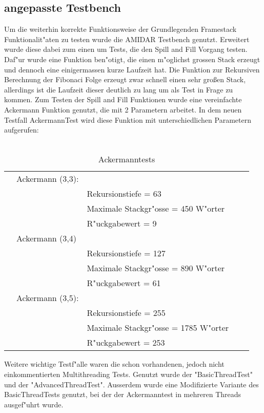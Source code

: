 \subsection{angepasste Testbench}
Um die weiterhin korrekte Funktionsweise der Grundlegenden Framestack Funktionalit"aten zu testen wurde die AMIDAR Testbench genutzt. Erweitert wurde diese dabei zum einen um Tests, die den Spill and Fill Vorgang testen. Daf"ur wurde eine Funktion ben"otigt, die einen m"oglichst gro{ss}en Stack erzeugt und dennoch eine einigerma{ss}en kurze Laufzeit hat. Die Funktion zur Rekursiven Berechnung der Fibonaci Folge erzeugt zwar schnell einen sehr großen Stack, allerdings ist die Laufzeit dieser deutlich zu lang um als Test in Frage zu kommen. Zum  Testen der Spill and Fill Funktionen wurde eine vereinfachte Ackermann Funktion genutzt, die mit 2 Parametern arbeitet.
In dem neuen Testfall AckermannTest wird diese Funktion mit unterschiedlichen Parametern aufgerufen: \\\\

\begin{table}[]
\centering
\caption{Ackermanntests}
\label{my-label}
\begin{tabular}{lllll}
 & Ackermann (3,3):  & \\
 &  & Rekursionstiefe 		= 63 \\
 &  & Maximale Stackgr"o{ss}e = 450 W"orter  \\
 &  & 	R"uckgabewert 			= 9 \\
 & Ackermann (3,4)  &\\
 &  & Rekursionstiefe			= 127 \\
 &	& Maximale Stackgr"o{ss}e = 890 W"orter\\
 &  & R"uckgabewert			= 61\\
 & Ackermann (3,5): &\\
 & & Rekursionstiefe			= 255\\
 & & Maximale Stackgr"o{ss}e = 1785 W"orter\\
 & &	R"uckgabewert			= 253
\end{tabular}
\end{table}



			
Weitere wichtige Testf"alle waren die schon vorhandenen, jedoch nicht einkommentierten Multithreading Tests. Genutzt wurde der "BasicThreadTest" und der "AdvancedThreadTest". Au{ss}erdem wurde eine Modifizierte Variante des BasicThreadTests genutzt, bei der der Ackermanntest in mehreren Threads ausgef"uhrt wurde. \\

